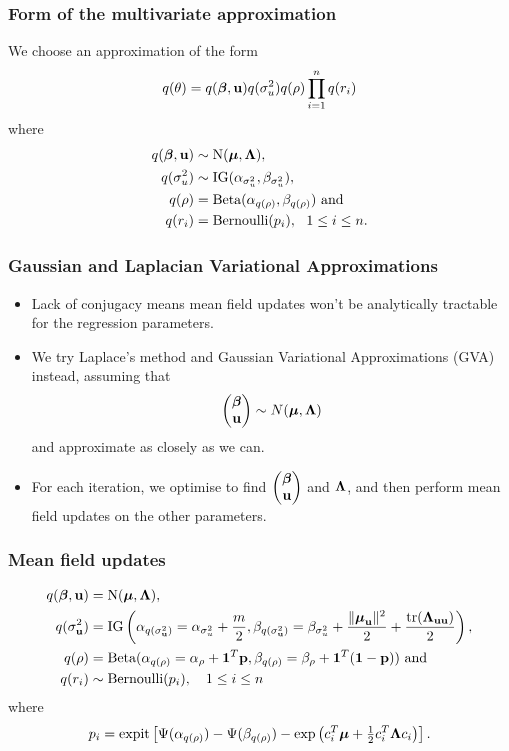 \documentclass{beamer}
\begin{document}
\begin{frame}
\frametitle{Form of the multivariate approximation}
We choose an approximation of the form
$$
q(\theta) = q({\boldsymbol \beta}, {\bf u}) q(\sigma_u^2) q(\rho) \prod_{i=1}^n q(r_i)
$$
where
\begin{align*}
q({\boldsymbol \beta}, {\bf u}) &\sim \text{N}({\boldsymbol \mu}, {\boldsymbol \Lambda}), \\
q(\sigma_u^2) &\sim \text{IG}(\alpha_{\sigma_u^2}, \beta_{\sigma_u^2}), \\
q(\rho) &= \text{Beta}(\alpha_{q(\rho)}, \beta_{q(\rho)}) \text{ and} \\
q(r_i) &= \text{Bernoulli}(p_i), \ \ 1 \leq i \leq n.
\end{align*}
\end{frame}

\begin{frame}
\frametitle{Gaussian and Laplacian Variational Approximations}
\begin{itemize}
\item Lack of conjugacy means mean field updates won't be analytically tractable for the regression parameters.
\item We try Laplace's method and Gaussian Variational Approximations (GVA) instead, assuming that
$$
\begin{pmatrix}
{\boldsymbol\beta} \\
{\bf u}
\end{pmatrix}
\sim N({\boldsymbol \mu}, {\boldsymbol \Lambda})
$$
and approximate as closely as we can.
\item For each iteration, we optimise to find
$\begin{pmatrix}
{\boldsymbol\beta} \\
{\bf u}
\end{pmatrix}
$ and ${\boldsymbol \Lambda}$,
and then perform mean field updates on the other parameters.
\end{itemize}
\end{frame}

\begin{frame}
\frametitle{Mean field updates}
\begin{align*}
q({\boldsymbol \beta}, {\bf u}) &= \text{N}({\boldsymbol \mu}, {\boldsymbol \Lambda}), \\
q(\sigma_{{\bf u}}^2) &= \text{IG}\left(\alpha_{q(\sigma_{{\bf u}}^2)} = \alpha_{\sigma_u^2} + \frac{m}{2}, \beta_{q(\sigma_{{\bf u}}^2)} = \beta_{\sigma_u^2} + \frac{\|{\boldsymbol \mu}_{\bf u}\|^2}{2} + \frac{\text{tr}({\boldsymbol \Lambda}_{{\bf u}{\bf u}})}{2}\right), \\
q(\rho) &= \text{Beta}(\alpha_{q(\rho)} = \alpha_\rho + {\bf 1}^T{\bf p}, \beta_{q(\rho)} = \beta_\rho + {\bf 1}^T({\bf 1} - {\bf p}))\text{ and} \\
q(r_i) & \sim \text{Bernoulli}{(p_i)}, \ \ \ 1 \leq i \leq n
\end{align*}
where
$$
p_i = \text{expit} \left [\Psi{(\alpha_{q(\rho)})} - \Psi{(\beta_{q(\rho)})} - \exp{\left(c_i^T{\boldsymbol\mu}+  \tfrac{1}{2} c_i^T {\boldsymbol\Lambda}c_i\right)} \right ].
$$
\end{frame}
\end{document}
